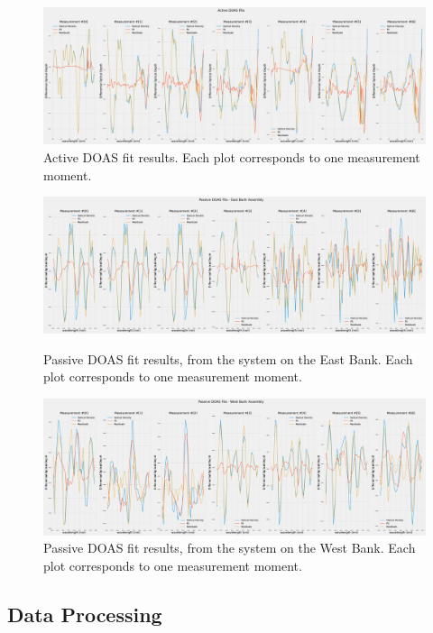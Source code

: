 \begin{figure}
    \centering
    \includegraphics[width=\textheight]{img/eps/fit_active.eps}
    \caption{Active \gls{DOAS} fit results. Each plot corresponds to one
    measurement moment.}
    \label{fig:fit_active}
\end{figure}

\begin{figure}
    \includegraphics[width=.82\textheight]{img/eps/fit_passive_back.eps}
    \caption{Passive \gls{DOAS} fit results, from the system on the East
    Bank. Each plot corresponds to one measurement moment.}
    \label{fig:fit_passive_back}
    \includegraphics[width=.82\textheight]{img/eps/fit_passive_front.eps}
    \caption{Passive \gls{DOAS} fit results, from the system on the West
    Bank. Each plot corresponds to one measurement moment.}
    \label{fig:fit_passive_front}
\end{figure}

\subsection{Data Processing}%
\label{sub:data_processing}

